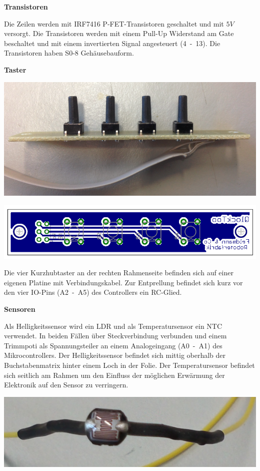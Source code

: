 \begin{multicols}{2}
\textbf{Transistoren}

Die Zeilen werden mit IRF7416 P-FET-Transistoren geschaltet und mit $5V$ versorgt. Die Transistoren werden mit einem Pull-Up Widerstand am Gate beschaltet und mit einem invertierten Signal angesteuert (4~-~13). Die Transistoren haben S0-8 Gehäusebauform. 

\textbf{Taster}

{
\centering 
\includegraphics[width=0.9\columnwidth]{Abbildungen/Konstruktion/Taster02} 
}

{
\centering 
\includegraphics[width=0.9\columnwidth]{Abbildungen/Elektronik/Taster01} 
}

Die vier Kurzhubtaster an der rechten Rahmenseite befinden sich auf einer eigenen Platine mit Verbindungskabel. Zur Entprellung befindet sich kurz vor den vier IO-Pins (A2~-~A5) des Controllers ein RC-Glied. 

\textbf{Sensoren}

Als Helligkeitssensor wird ein LDR und als Temperatursensor ein NTC verwendet. In beiden Fällen über Steckverbindung verbunden und einem Trimmpoti als Spannungsteiler an einem Analogeingang (A0~-~A1) des Mikrocontrollers. Der Helligkeitssensor befindet sich mittig oberhalb der Buchstabenmatrix hinter einem Loch in der Folie. Der Temperatursensor befindet sich seitlich am Rahmen um den Einfluss der möglichen Erwärmung der Elektronik auf den Sensor zu verringern. \newline

{
\centering 
\includegraphics[width=0.9\columnwidth]{Abbildungen/Elektronik/LDR} 

}
\end{multicols}
